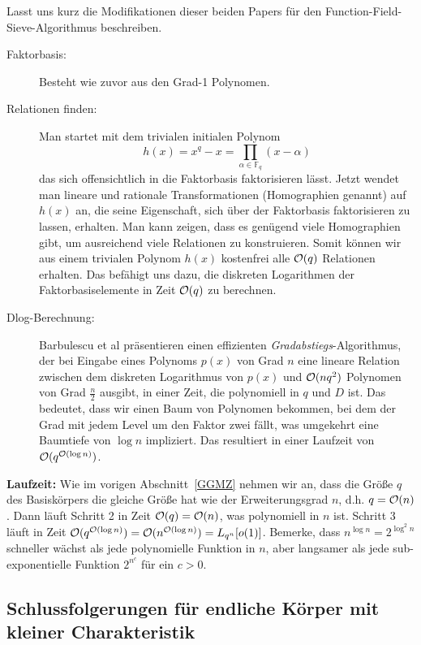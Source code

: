 \begin{refsegment}
Lasst uns kurz die Modifikationen dieser beiden Papers für den Function-Field-Sieve-Algo\-rith\-mus beschreiben.


\begin{description}
\item[Faktorbasis:] Besteht wie zuvor aus den Grad-1 Polynomen.
\item[Relationen finden:] Man startet mit dem trivialen initialen Polynom
$$
  h(x)= x^q-x = \prod_{\alpha \in \mathbb{F}_q} (x-\alpha)
$$
das sich offensichtlich in die Faktorbasis faktorisieren lässt. Jetzt wendet man lineare und rationale Transformationen (Homographien genannt) auf $h(x)$ an, die seine Eigenschaft, sich über der Faktorbasis faktorisieren zu lassen, erhalten. Man kann zeigen, dass es genügend viele Homographien gibt, um ausreichend viele Relationen zu konstruieren. Somit können wir aus einem trivialen Polynom $h(x)$ kostenfrei alle ${\cal O}(q)$ Relationen erhalten. Das befähigt uns dazu, die diskreten Logarithmen der Faktorbasiselemente in Zeit ${\cal O}(q)$ zu berechnen.
\item[Dlog-Berechnung:] Barbulescu et al präsentieren einen effizienten {\em Gradabstiegs}-Algorithmus, der bei Eingabe eines Polynoms $p(x)$ von Grad $n$ eine lineare Relation zwischen dem diskreten Logarithmus von $p(x)$ und ${\cal O}(nq^2)$ Polynomen von Grad $\frac n 2$ ausgibt, in einer Zeit, die polynomiell in $q$ und $D$ ist. Das bedeutet, dass wir einen Baum von Polynomen bekommen, bei dem der Grad mit jedem Level um den Faktor zwei fällt, was umgekehrt eine Baumtiefe von $\log n$ impliziert. Das resultiert in einer Laufzeit von ${\cal O}(q^{{\cal O}(\log n)})$.
\end{description}

\noindent \textbf{Laufzeit:}
Wie im vorigen Abschnitt~\ref{GGMZ} nehmen wir an, dass die Größe $q$ des Basiskörpers die gleiche Größe hat wie der Erweiterungsgrad $n$, d.h. $q={\cal O}(n)$. Dann läuft Schritt 2 in Zeit ${\cal O}(q)={\cal O}(n)$, was polynomiell in $n$ ist. Schritt 3 läuft in Zeit ${\cal O}(q^{{\cal O}(\log n)})={\cal O}(n^{{\cal O}(\log n)}) = L_{q^n}[o(1)]$. Bemerke, dass $n^{\log n}=2^{\log^2 n}$ schneller wächst als jede polynomielle Funktion in $n$, aber langsamer als jede sub-exponentielle Funktion $2^{n^{c}}$ für ein $c>0$.


\subsection{Schlussfolgerungen für endliche Körper mit kleiner Charakteristik}


\end{refsegment}
